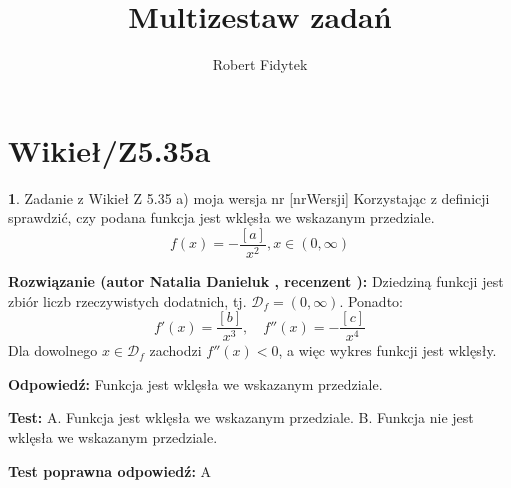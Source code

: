 \documentclass[12pt, a4paper]{article}
\title{Multizestaw zadań}
\author{Robert Fidytek}
\date{}
\theoremstyle{definition} %
\newtheorem{zad}{}
\newcommand{\kategoria}[1]{\section{#1}} %
\newcommand{\zadStart}[1]{\begin{zad}#1\newline} %
\newcommand{\zadStop}{\end{zad}}   %
\newcommand{\rozwStart}[2]{\noindent \textbf{Rozwiązanie (autor #1 , recenzent #2): }\newline} %
\newcommand{\rozwStop}{\newline}                                            %
\newcommand{\odpStart}{\noindent \textbf{Odpowiedź:}\newline}    %
\newcommand{\odpStop}{\newline}                                             %
\newcommand{\testStart}{\noindent \textbf{Test:}\newline} %
\newcommand{\testStop}{\newline} %
\newcommand{\kluczStart}{\noindent \textbf{Test poprawna odpowiedź:}\newline} %
\newcommand{\kluczStop}{\newline} %
\begin{document}
\maketitle

\kategoria{Wikieł/Z5.35a}

\zadStart{Zadanie z Wikieł Z 5.35 a) moja wersja nr [nrWersji]}
Korzystając z definicji sprawdzić, czy podana funkcja jest wklęsła we wskazanym przedziale.
$$f(x) = -\frac{[a]}{x^2}, x \in (0,\infty)$$
\zadStop

\rozwStart{Natalia Danieluk}{}
Dziedziną funkcji jest zbiór liczb rzeczywistych dodatnich, tj. $\mathcal{D}_f=(0,\infty)$. Ponadto:
$$f'(x) = \frac{[b]}{x^3},\quad f''(x) = -\frac{[c]}{x^4}$$
Dla dowolnego $x \in \mathcal{D}_f$ zachodzi $f''(x) < 0$, a więc wykres funkcji jest wklęsły.
\rozwStop

\odpStart
Funkcja jest wklęsła we wskazanym przedziale.
\odpStop

\testStart
A. Funkcja jest wklęsła we wskazanym przedziale.
B. Funkcja nie jest wklęsła we wskazanym przedziale.
\testStop

\kluczStart
A
\kluczStop
\end{document}
